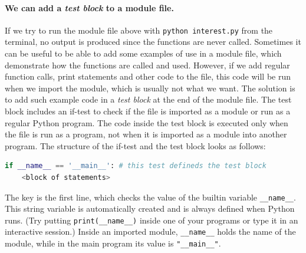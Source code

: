 \documentclass[graybox,envcountchap,sectrefs,final]{svmonodo}
\begin{document}
\paragraph{We can add a \emph{test block} to a module file.}
If we try to run the module file above with \texttt{python interest.py} from the terminal, no output is produced since
the functions are never called. Sometimes it can be useful to be able to add some examples of use in a module file,
which demonstrate how the functions are called and used. However, if we add regular function calls, print statements
and other code to the file, this code will be run when we import the module, which is usually not what we want.
The solution is to add such example code in a \emph{test block} at the end of the module file. The test block includes
an if-test to check if the file is imported as a module or run as a regular Python program. The code inside the test block
is executed only when the file is run as a program, not when it is imported as a module into another program.
The structure of the if-test and the test block looks as follows:
\begin{lstlisting}[language=Python,style=blue1]
if __name__ == '__main__': # this test defineds the test block
    <block of statements>
\end{lstlisting}
The key is the first line, which checks the value of the builtin variable \Verb!__name__!. This string variable is
automatically created and is always defined when Python runs.
(Try putting \Verb!print(__name__)! inside one of your programs or type it
in an interactive session.) Inside an imported module, \Verb!__name__! holds the name of the module, while in the main
program its value is \Verb!"__main__"!.
\end{document}
